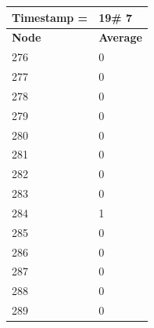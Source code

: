 \begin{tabular}{|l||l|}
\hline
\textbf{Timestamp =} & \textbf{19}\# 7\\\hline
	\textbf{Node} & \textbf{Average} \\ \hline
\hline
	276 & 0 \\ \hline
	277 & 0 \\ \hline
	278 & 0 \\ \hline
	279 & 0 \\ \hline
	280 & 0 \\ \hline
	281 & 0 \\ \hline
	282 & 0 \\ \hline
	283 & 0 \\ \hline
	284 & 1 \\ \hline
	285 & 0 \\ \hline
	286 & 0 \\ \hline
	287 & 0 \\ \hline
	288 & 0 \\ \hline
	289 & 0 \\ \hline
\end{tabular}

